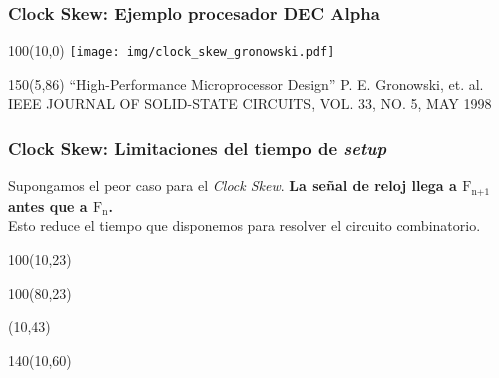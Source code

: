 \documentclass[aspectratio=169]{beamer}
\begin{document}
\begin{frame}[fragile,t]
    \frametitle{Clock Skew: Ejemplo procesador DEC Alpha}    
    \begin{textblock}{100}(10,0) \texttt{[image: img/clock\_skew\_gronowski.pdf]} \end{textblock}
    \begin{textblock}{150}(5,86)
    \scriptsize
    ``High-Performance Microprocessor Design'' P. E. Gronowski, et. al.
    IEEE JOURNAL OF SOLID-STATE CIRCUITS, VOL. 33, NO. 5, MAY 1998
    \end{textblock}
\end{frame}

\begin{frame}[fragile,t]
    \frametitle{Clock Skew: Limitaciones del tiempo de \emph{setup}}
    Supongamos el peor caso para el \emph{Clock Skew}. \textbf{La señal de reloj llega a $\text{F}_{\text{n+1}}$ antes que a $\text{F}_{\text{n}}$.}\\
    \textcolor{verdeuca}{Esto reduce el tiempo que disponemos para resolver el circuito combinatorio.}
    \begin{textblock}{100}(10,23)
    \end{textblock}
    \begin{textblock}{100}(80,23)
    \end{textblock}
    \begin{textblock}{60}(10,43)
    \end{textblock}
    \begin{textblock}{140}(10,60)
    \bigskip
    \end{textblock}
\end{frame}
\end{document}
